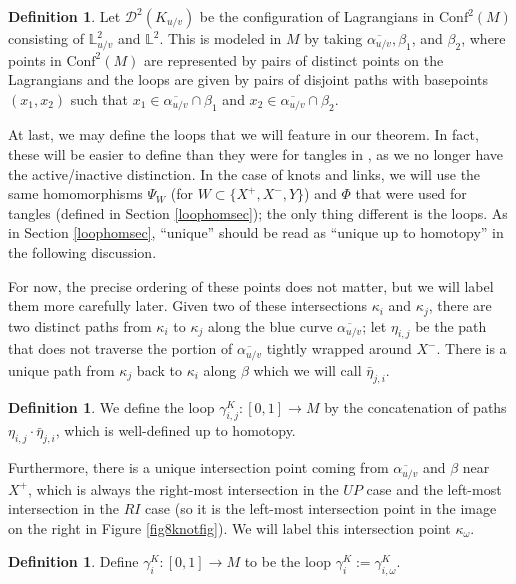 \documentclass[11pt]{amsart}
\theoremstyle{plain}
\theoremstyle{definition}
\newtheorem{definitionN}[theoremN]{Definition}
\theoremstyle{remark}
\begin{document}
\begin{definitionN}
    Let $\mathcal{D}^2(K_{u/v})$ be the configuration of Lagrangians in $\text{Conf}^2(M)$ consisting of  $\mathbb{L}_{u/v}^2$ and $\mathbb{L}^2$. This is modeled in $M$ by taking $\overline{\alpha_{u/v}}, \beta_1$, and $\beta_2$, where points in $\text{Conf}^2(M)$ are represented by pairs of distinct points on the Lagrangians and the loops are given by pairs of disjoint paths with basepoints $(x_1,x_2)$ such that $x_1\in \overline{\alpha_{u/v}}\cap \beta_1$ and $x_2\in \overline{\alpha_{u/v}}\cap \beta_2$.
\end{definitionN}


At last, we may define the loops that we will feature in our theorem. In fact, these will be easier to define than they were for tangles in \cite{JHpI26}, as we no longer have the active/inactive distinction. In the case of knots and links, we will use the same homomorphisms $\Psi_W$ (for $W\subset \{X^+,X^-,Y\}$) and $\Phi$ that were used for tangles (defined in Section \ref{loophomsec}); the only thing different is the loops. As in Section \ref{loophomsec}, ``unique'' should be read as ``unique up to homotopy'' in the following discussion.

For now, the precise ordering of these points does not matter, but we will label them more carefully later. Given two of these intersections $\kappa_i$ and $\kappa_j$, there are two distinct paths from $\kappa_i$ to $\kappa_j$ along the blue curve $\overline{\alpha_{u/v}}$; let $\eta_{i,j}$ be the path that does not traverse the portion of $\overline{\alpha_{u/v}}$ tightly wrapped around $X^-$.  There is a unique path from $\kappa_j$ back to $\kappa_i$ along $\beta$ which we will call $\bar \eta_{j,i}$. 

\begin{definitionN}
We define the loop $\gamma_{i,j}^K:[0,1]\to M$ by the concatenation of paths $\eta_{i,j}\cdot\bar\eta_{j,i}$, which is well-defined up to homotopy.   
\end{definitionN}

Furthermore, there is a unique intersection point coming from $\overline{\alpha_{u/v}}$ and $\beta$ near $X^+$, which is always the right-most intersection in the $UP$ case and the left-most intersection in the $RI$ case (so it is the left-most intersection point in the image on the right in Figure \ref{fig8knotfig}). We will label this intersection point $\kappa_\omega$. 

\begin{definitionN}
 Define $\gamma_i^K:[0,1]\to M$ to be the loop $\gamma^K_i:=\gamma^K_{i,\omega}$.   
\end{definitionN}
\end{document}
